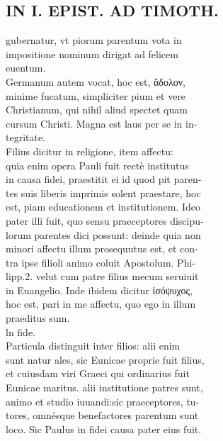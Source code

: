 \documentclass{article}
\begin{document}
\begin{pages}
\section*{IN I. EPIST. AD TIMOTH. \\
                }
gubernatur, vt piorum parentum vota in \\
                impositione nominum dirigat ad felicem \\
                euentum. \\
                Germanum autem vocat, hoc est, ἄδολον, \\
                minime fucatum, simpliciter pium et vere \\
                Christianum, qui nihil aliud spectet quam \\
                cursum Christi. Magna est laus per se in in- \\
                tegritate. \\
                Filius dicitur in religione, item affectu: \\
                quia enim opera Pauli fuit rectè institutus \\
                in causa fidei, praestitit ei id quod pit paren- \\
                tes suis liberis imprimis solent praestare, hoc \\
                est, piam educationem et institutionem. Ideo \\
                pater illi fuit, quo sensu praeceptores discipu- \\
                lorum parentes dici possunt: deinde quia non \\
                minori affectu illum prosequutus est, et con- \\
                tra ipse filioli animo coluit Apostolum. Phi- \\
                lipp.2. velut cum patre filius mecum seruiuit \\
                in Euangelio. Inde ibidem dicitur ἰσόψυχος, \\
                hoc est, pari in me affectu, quo ego in illum \\
                praeditus sum. \\
                ln fide. \\
                Particula distinguit inter filios: alii enim \\
                sunt natur ales, sic Eunicae proprie fuit filius, \\
                et cuiusdam viri Graeci qui ordinarius fuit \\
                Eunicae maritus. alii institutione patres sunt, \\
                animo et studio iuuandi:sic praeceptores, tu- \\
                tores, omnésque benefactores parentum sunt \\
                loco. Sic Paulus in fidei causa pater eius fuit. \\
                

\end{pages}
\end{document}
